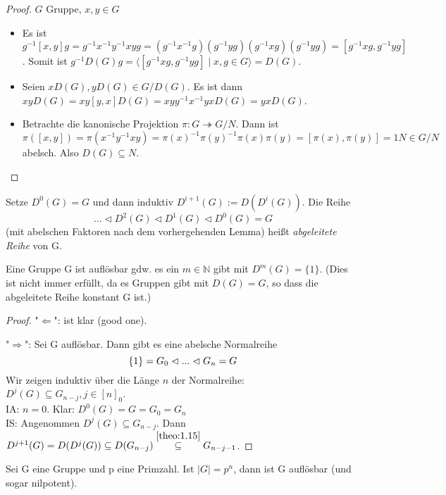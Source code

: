 \documentclass[../main.tex]{subfiles}
\begin{document}
\begin{proof}
$G$ Gruppe, $x, y \in G$
\begin{itemize}
    \item Es ist $g^{-1}[x,y]g = g^{-1}x^{-1}y^{-1}xyg = (g^{-1}x^{-1}g)(g^{-1}yg)(g^{-1}xg)(g^{-1}yg) = [g^{-1}xg, g^{-1}yg]$. Somit ist $g^{-1}D(G)g = \langle[g^{-1}xg, g^{-1}yg] \mid x,g \in G\rangle = D(G)$.
    
    \item Seien $xD(G), yD(G) \in G/D(G)$. Es ist dann $xyD(G) = xy[y,x]D(G) = xyy^{-1}x^{-1}yxD(G) = yxD(G)$. 
    
    \item Betrachte die kanonische Projektion $\pi: G \twoheadrightarrow G/N$. Dann ist $\pi([x,y]) = \pi(x^{-1}y^{-1}xy) = \pi(x)^{-1}\pi(y)^{-1}\pi(x)\pi(y) = [\pi(x), \pi(y)] = 1N \in G/N$ abelsch.
    Also $D(G) \subseteq N$.
\end{itemize}
\end{proof}
\begin{definition}
    Setze $D^0(G) = G$ und dann induktiv $D^{i+1}(G) := D(D^i(G))$. Die Reihe 
    $$... \triangleleft D^2(G) \triangleleft D^1(G) \triangleleft D^0(G) = G$$
    (mit abelschen Faktoren nach dem vorhergehenden Lemma) heißt \emph{abgeleitete Reihe} von G.
\end{definition}
\begin{theorem}
    Eine Gruppe G ist auflösbar gdw. es ein $m \in \mathbb{N}$ gibt mit $D^m(G) = \{1\}$. (Dies ist nicht immer erfüllt, da es Gruppen gibt mit $D(G) = G$, so dass die abgeleitete Reihe konstant G ist.)
\end{theorem}
\begin{proof}
    "$\Leftarrow$": ist klar (good one).

    "$\Rightarrow$": Sei G auflösbar. Dann gibt es eine abelsche Normalreihe
    $$\{1\} = G_0 \vartriangleleft ... \vartriangleleft G_n = G$$
    Wir zeigen induktiv über die Länge $n$ der Normalreihe: $D^j(G) \subseteq G_{n-j}, j \in [n]_0$.\\
    IA: $n=0$. Klar: $D^0(G) = G = G_0 = G_n$\\
    IS: Angenommen $D^j(G) \subseteq G_{n-j}$. Dann $D^{j+1}(G) = D(D^j(G)) \subseteq D(G_{n-j}) \overset{\ref{theo:1.15}}{\subseteq} G_{n-j-1}$.
\end{proof}
\begin{example}
    Sei G eine Gruppe und p eine Primzahl. Ist $|G| = p^n$, dann ist G auflösbar (und sogar nilpotent).
\end{example}
\end{document}
